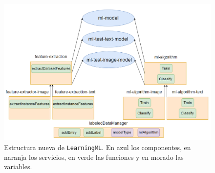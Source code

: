 \documentclass[a4paper, 12pt]{book}
\begin{document}
\begin{figure}
	\centering
	\includegraphics[width=12cm, keepaspectratio]{img/modelonuevo}
	\caption{Estructura nueva de \texttt{LearningML}. En azul los componentes, en naranja los servicios, en verde las funciones y en morado las variables.}					\label{fig:modelonuevo}
\end{figure}
\end{document}
